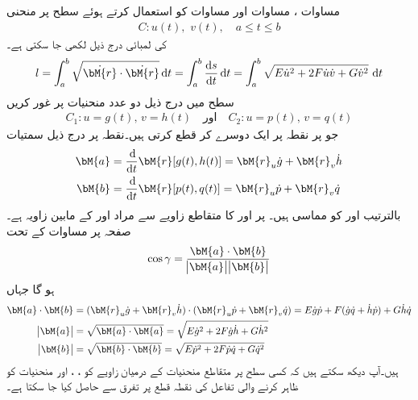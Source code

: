 مساوات ، مساوات  اور مساوات  کو استعمال کرتے ہوئے سطح  پر منحنی
\begin{align*}
C:u(t),\,\, v(t),\quad a\le t\le b
\end{align*}
کی لمبائی درج ذیل لکھی جا سکتی ہے۔
\begin{align}
l=\int_a^b \sqrt{\dot{\bM{r}}\cdot \dot{\bM{r}}}\dif t=\int_a^b \frac{\dif s}{\dif t}\dif t=\int_a^b \sqrt{E\dot{u}^2+2F\dot{u}\dot{v}+G\dot{v}^2}\,\dif t
\end{align}
سطح  میں درج ذیل دو عدد منحنیات پر غور کریں
\begin{align*}
C_1:u=g(t),\, v=h(t) \quad \text{اور} \quad C_2:u=p(t),\, v=q(t)
\end{align*}
جو  پر نقطہ  پر ایک دوسرے کر قطع کرتی ہیں۔نقطہ  پر درج ذیل سمتیات
\begin{align*}
\bM{a}&=\frac{\dif}{\dif t}\bM{r}[g(t),h(t)]=\bM{r}_u\dot{g}+\bM{r}_v\dot{h}\\
\bM{b}&=\frac{\dif}{\dif t}\bM{r}[p(t),q(t)]=\bM{r}_u\dot{p}+\bM{r}_v\dot{q}
\end{align*}
بالترتیب  اور  کو مماسی ہیں۔ پر  اور  کا متقاطع زاویے سے مراد  اور  کے مابین زاویہ  ہے۔صفحہ  پر مساوات  کے تحت
\begin{align}
\cos \gamma=\frac{\bM{a}\cdot \bM{b}}{\abs{\bM{a}}\abs{\bM{b}}}
\end{align}
ہو گا جہاں
\begin{align*}
\bM{a}\cdot\bM{b}&=(\bM{r}_u\dot{g}+\bM{r}_v\dot{h})\cdot (\bM{r}_u\dot{p}+\bM{r}_v\dot{q})=E\dot{g}\dot{p}+F(\dot{g}\dot{q}+\dot{h}\dot{p})+G\dot{h}\dot{q}\\
\abs{\bM{a}}&=\sqrt{\bM{a}\cdot\bM{a}}=\sqrt{E\dot{g}^2+2F\dot{g}\dot{h}+G\dot{h}^2}\\
\abs{\bM{b}}&=\sqrt{\bM{b}\cdot\bM{b}}=\sqrt{E\dot{p}^2+2F\dot{p}\dot{q}+G\dot{q}^2}
\end{align*}
ہیں۔آپ دیکھ سکتے ہیں کہ کسی سطح پر متقاطع منحنیات کے درمیان زاویے کو ، ،  اور  منحنیات کو ظاہر کرنے والی تفاعل کی نقطہ قطع پر تفرق سے حاصل کیا جا سکتا ہے۔

